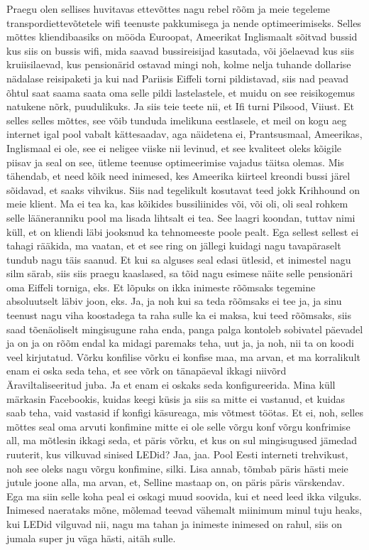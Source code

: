 Praegu olen sellises huvitavas ettevõttes nagu rebel rõõm ja meie tegeleme transpordiettevõtetele wifi teenuste pakkumisega ja nende optimeerimiseks. Selles mõttes kliendibaasiks on mööda Euroopat, Ameerikat Inglismaalt sõitvad bussid kus siis on bussis wifi, mida saavad bussireisijad kasutada, või jõelaevad kus siis kruiisilaevad, kus pensionärid ostavad mingi noh, kolme nelja tuhande dollarise nädalase reisipaketi ja kui nad Pariisis Eiffeli torni pildistavad, siis nad peavad õhtul saat saama saata oma selle pildi lastelastele, et muidu on see reisikogemus natukene nõrk, puudulikuks. Ja siis teie teete nii, et Ifi turni Pilsood, Viiust.
Et selles selles mõttes, see võib tunduda imelikuna eestlasele, et meil on kogu aeg internet igal pool vabalt kättesaadav, aga näidetena ei, Prantsusmaal, Ameerikas, Inglismaal ei ole, see ei neligee viiske nii levinud, et see kvaliteet oleks kõigile piisav ja seal on see, ütleme teenuse optimeerimise vajadus täitsa olemas.
Mis tähendab, et need kõik need inimesed, kes Ameerika kiirteel kreondi bussi järel sõidavad, et saaks vihvikus.
Siis nad tegelikult kosutavat teed jokk Krihhound on meie klient. Ma ei tea ka, kas kõikides bussiliinides või, või oli, oli seal rohkem selle lääneranniku pool ma lisada lihtsalt ei tea. See laagri koondan, tuttav nimi küll, et on kliendi läbi jooksnud ka tehnomeeste poole pealt.
Ega sellest sellest ei tahagi rääkida, ma vaatan, et et see ring on jällegi kuidagi nagu tavapäraselt tundub nagu täis saanud. Et kui sa alguses seal edasi ütlesid, et inimestel nagu silm särab, siis siis praegu kaaslased, sa tõid nagu esimese näite selle pensionäri oma Eiffeli torniga, eks. Et lõpuks on ikka inimeste rõõmsaks tegemine absoluutselt läbiv joon, eks.
Ja, ja noh kui sa teda rõõmsaks ei tee ja, ja sinu teenust nagu viha koostadega ta raha sulle ka ei maksa, kui teed rõõmsaks, siis saad tõenäoliselt mingisugune raha enda, panga palga kontoleb sobivatel päevadel ja on ja on rõõm endal ka midagi paremaks teha, uut ja, ja noh, nii ta on koodi veel kirjutatud. Võrku konfilise võrku ei konfise maa, ma arvan, et ma korralikult enam ei oska seda teha, et see võrk on tänapäeval ikkagi niivõrd Äraviltaliseeritud juba. Ja et enam ei oskaks seda konfigureerida.
Mina küll märkasin Facebookis, kuidas keegi küsis ja siis sa mitte ei vastanud, et kuidas saab teha, vaid vastasid if konfigi käsureaga, mis võtmest töötas.
Et ei, noh, selles mõttes seal oma arvuti konfimine mitte ei ole selle võrgu konf võrgu konfrimise all, ma mõtlesin ikkagi seda, et päris võrku, et kus on sul mingisugused jämedad ruuterit, kus vilkuvad sinised LEDid? Jaa, jaa.
Pool Eesti interneti trehvikust, noh see oleks nagu võrgu konfimine, silki.
Lisa annab, tõmbab päris hästi meie jutule joone alla, ma arvan, et,
Selline mastaap on, on päris päris värskendav. Ega ma siin selle koha peal ei oskagi muud soovida, kui et need leed ikka vilguks.
Inimesed naerataks mõne, mõlemad teevad vähemalt miinimum minul tuju heaks, kui LEDid vilguvad nii, nagu ma tahan ja inimeste inimesed on rahul, siis on jumala super ju väga hästi, aitäh sulle.

